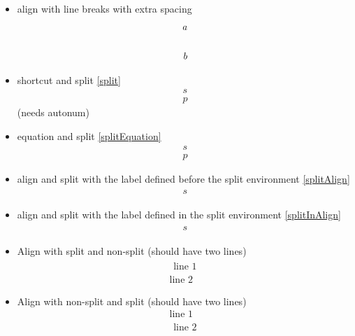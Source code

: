 \documentclass{article}
\begin{document}
\begin{itemize}
{		}
		\item align with line breaks with extra spacing
			\begin{align}
				a
				\\[\baselineskip]
				b
			\end{align}
		\item shortcut and split \ref{split} \[ \label{split}\begin{split} s \\ p \end{split} \] (needs autonum)
		\item equation and split \ref{splitEquation} \begin{equation} \label{splitEquation}\begin{split} s \\ p \end{split} \end{equation}
		\item align and split with the label defined before the split environment \ref{splitAlign}
			\begin{align}
				\label{splitAlign}
				\begin{split}
					s
				\end{split}
			\end{align}
			\makeatletter
			\makeatother
		\item align and split with the label defined in the split environment \ref{splitInAlign}
			\begin{align}
				\begin{split}
					s\label{splitInAlign}
				\end{split}
			\end{align}
		\item Align with split and non-split (should have two lines)
			\begin{align}
				\begin{split}
					\text{line 1}
				\end{split}
				\\
				\text{line 2}
			\end{align}
		\item Align with non-split and split (should have two lines)
			\begin{align}
				\text{line 1}
				\\
				\begin{split}
					\text{line 2}
				\end{split}
			\end{align}

\end{itemize}
\end{document}

